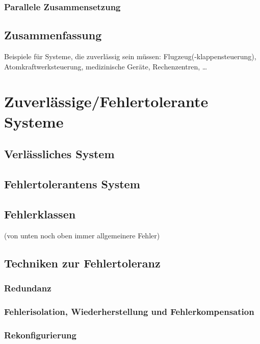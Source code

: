\subsubsection{Parallele Zusammensetzung}

\subsection{Zusammenfassung}

Beispiele für Systeme, die zuverlässig sein müssen: Flugzeug(-klappensteuerung), Atomkraftwerksteuerung, medizinische Geräte, Rechenzentren, …

\section{Zuverlässige/Fehlertolerante Systeme}
\subsection{Verlässliches System}
\subsection{Fehlertolerantens System}
\subsection{Fehlerklassen}
(von unten noch oben immer allgemeinere Fehler)
\subsection{Techniken zur Fehlertoleranz}
\subsubsection{Redundanz}
\subsubsection{Fehlerisolation, Wiederherstellung und Fehlerkompensation}
\subsubsection{Rekonfigurierung}
